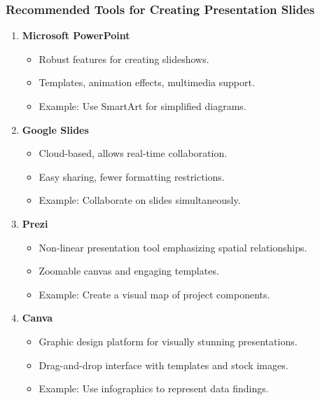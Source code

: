 \documentclass{beamer}
\begin{document}
\begin{frame}[fragile]
    \frametitle{Recommended Tools for Creating Presentation Slides}
    \begin{enumerate}
        \item \textbf{Microsoft PowerPoint}
            \begin{itemize}
                \item Robust features for creating slideshows.
                \item Templates, animation effects, multimedia support.
                \item Example: Use SmartArt for simplified diagrams.
            \end{itemize}
        \item \textbf{Google Slides}
            \begin{itemize}
                \item Cloud-based, allows real-time collaboration.
                \item Easy sharing, fewer formatting restrictions.
                \item Example: Collaborate on slides simultaneously.
            \end{itemize}
        \item \textbf{Prezi}
            \begin{itemize}
                \item Non-linear presentation tool emphasizing spatial relationships.
                \item Zoomable canvas and engaging templates.
                \item Example: Create a visual map of project components.
            \end{itemize}
        \item \textbf{Canva}
            \begin{itemize}
                \item Graphic design platform for visually stunning presentations.
                \item Drag-and-drop interface with templates and stock images.
                \item Example: Use infographics to represent data findings.
            \end{itemize}
    \end{enumerate}
\end{frame}
\end{document}
